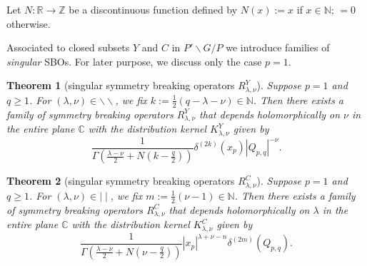 \documentclass[reqno,12pt]{pja00} %
\newcommand{\myabs}[1]{\left|#1\right|}
\providecommand{\C}{\mathbb{C}}
\newcommand{\Z}{\mathbb{Z}}
\newcommand{\R}{\mathbb{R}}
\newcommand{\N}{\mathbb{N}}
\newcommand{\Q}{\mathbb{Q}}
\theoremstyle{plain}
\newtheorem{theorem}{Theorem}[section]
\theoremstyle{definition}
\theoremstyle{exampstyle} \newtheorem{examp}[theorem]{Theorem}
\renewcommand{\Q}{Q_{p,q}}
\begin{document}
Let $N\colon\R\to\Z$ be a discontinuous function defined
by $N(x):=x$ if $x \in \mathbb N$; $=0$ otherwise.

Associated to closed subsets $Y$ and $C$ in $P'\backslash G/P$ we introduce families of
\textit{singular} SBOs. For later purpose, we discuss only the case $p=1$.
\begin{theorem}[singular symmetry breaking operators $R_{\lambda,\nu}^Y$]\label{thm:singY}
	Suppose $p=1$ and $q\ge1$. For $(\lambda,\nu)\in\backslash\backslash$, we fix $k:=\frac{1}{2}\left( q-\lambda-\nu \right)\in\N$. Then there exists a family of symmetry breaking operators
	$R_{\lambda,\nu}^Y$ that depends holomorphically on $\nu$ in the entire plane $\C$ with the distribution kernel $K_{\lambda,\nu}^Y$ given by\begin{equation*}
		\frac{1}{\Gamma\left( \frac{\lambda-\nu}{2}+N\left( k-\frac{q}{2} \right) \right)}\delta^{(2k)}(x_p)\myabs{\Q}^{-\nu}.
	\end{equation*}
\end{theorem}
\begin{theorem}[singular symmetry breaking operators $R_{\lambda,\nu}^C$]\label{thm:singC}
	Suppose $p=1$ and $q\ge1$. For $(\lambda,\nu)\in\mid\mid$, we fix $m:=\frac{1}{2}\left(\nu-1 \right)\in\N$. Then there exists a family of symmetry breaking operators
	$R_{\lambda,\nu}^C$ that depends holomorphically on $\lambda$ in the entire plane $\C$ with the distribution kernel $K_{\lambda,\nu}^C$ given by
	\begin{equation*}
	\frac{1}{\Gamma\left( \frac{\lambda-\nu}{2}+N\left(\nu- \frac{q}{2} \right) \right)}\myabs{x_p}^{\lambda+\nu-n}\delta^{(2m)}(\Q).
	\end{equation*}
\end{theorem}
\end{document}
